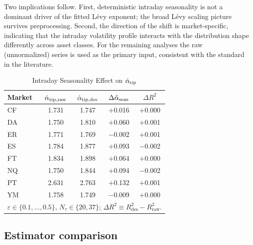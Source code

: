 \documentclass[12pt,a4paper]{article}
\begin{document}
Two implications follow.
First, deterministic intraday seasonality is not a dominant driver of the fitted
Lévy exponent; the broad Lévy scaling picture survives preprocessing.
Second, the direction of the shift is market-specific, indicating that the intraday
volatility profile interacts with the distribution shape differently across asset
classes.
For the remaining analyses the raw (unnormalized) series is used as the
primary input, consistent with the standard in the literature.

\begin{table}[htbp]
\begin{center}
\caption{Intraday Seasonality Effect on $\hat{\alpha}_{\mathrm{tip}}$}
\begin{tabular}{lcccc}
\hline
Market & $\hat{\alpha}_{\mathrm{tip,raw}}$ & $\hat{\alpha}_{\mathrm{tip,des}}$
       & $\Delta\hat{\alpha}_{\mathrm{seas}}$ & $\Delta R^2$ \\
\hline
CF & 1.731 & 1.747 & $+$0.016 & $+$0.000 \\
DA & 1.750 & 1.810 & $+$0.060 & $+$0.001 \\
ER & 1.771 & 1.769 & $-$0.002 & $+$0.001 \\
ES & 1.784 & 1.877 & $+$0.093 & $-$0.002 \\
FT & 1.834 & 1.898 & $+$0.064 & $+$0.000 \\
NQ & 1.750 & 1.844 & $+$0.094 & $-$0.002 \\
PT & 2.631 & 2.763 & $+$0.132 & $+$0.001 \\
YM & 1.758 & 1.749 & $-$0.009 & $+$0.000 \\
\hline
\multicolumn{5}{l}{$\varepsilon\in\{0.1,\ldots,0.5\}$, $N_\tau\in\{20,37\}$;
  $\Delta R^2 \equiv R^2_{\mathrm{des}} - R^2_{\mathrm{raw}}$.}
\end{tabular}
\label{tab:seasonality}
\end{center}
\end{table}


\subsection{Estimator comparison}
\label{sec:results:estimators}
\end{document}
